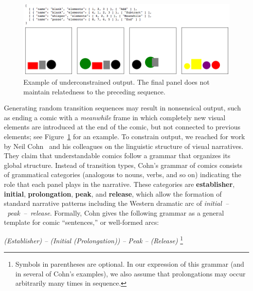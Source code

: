 \begin{figure}[b]
\centering
\includegraphics[width=0.8\columnwidth]{comicgen-underconstrained-2.png}
\caption{Example of underconstrained output. The final panel does not
maintain relatedness to the preceding sequence.}
\label{fig:outbad}
\end{figure}

Generating random transition sequences may result in nonsensical output,
such as ending a comic with a \emph{meanwhile} frame in which completely new
visual elements are introduced at the end of the comic, but not connected to 
previous elements; see Figure~\ref{fig:outbad} for an example. 
To constrain output, we reached for work by Neil Cohn~\cite{cohn2016visual}
and his colleagues on the linguistic structure of visual narratives. They
claim that understandable comics follow a grammar that organizes its global
structure. Instead of transition types, Cohn's grammar of comics consists
of grammatical categories (analogous to nouns, verbs, and so on) indicating
the role that each panel plays in the narrative. These categories are {\bf
establisher}, {\bf initial}, {\bf prolongation}, {\bf peak}, and {\bf
release}, which allow the formation of standard narrative patterns
including the Western dramatic arc of \hbox{\em initial -- peak --
release}. Formally, Cohn gives the following grammar as a general template
for comic ``sentences,'' or well-formed arcs:

{\it (Establisher) -- (Initial (Prolongation)) -- Peak -- (Release)}
\footnote{Symbols in parentheses are optional. In our expression of this grammar (and
in several of Cohn's examples), we also assume that prolongations may occur
arbitrarily many times in sequence.}

